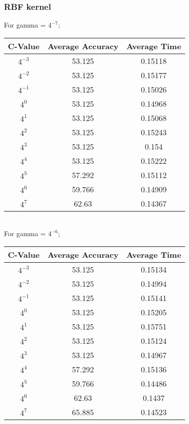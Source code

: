 \documentclass[letter,11pt]{article}
\begin{document}
\subsubsection{RBF kernel}
			
For gamma = $4^{-7}$;

\begin{tabular}{|c| c |c |} 
	\hline
	C-Value & Average Accuracy & Average Time \\ [0.5ex] 			
	\hline
	$4^{-3}$ & 53.125  & 0.15118 \\ [0.5ex] 
	\hline
	$4^{-2}$ & 53.125 & 0.15177  \\ 
	\hline
	$4^{-1}$ &  53.125 	  & 0.15026\\
	\hline
	$4^{0}$ &  53.125  & 0.14968\\
	\hline
	$4^{1}$ & 53.125  & 0.15068\\
	\hline
	$4^{2}$ &  53.125 & 0.15243\\
	\hline
	$4^{3}$ &   53.125  & 0.154\\
	\hline
	$4^{4}$ &  53.125  & 0.15222\\
	\hline
	$4^{5}$ &  57.292   & 0.15112\\
	\hline
	$4^{6}$ & 59.766  & 0.14909\\
	\hline
	$4^{7}$ &  62.63 & 0.14367\\
	\hline
	
\end{tabular}\\

For gamma = $4^{-6}$;

\begin{tabular}{|c| c |c |} 
	\hline
	C-Value & Average Accuracy & Average Time \\ [0.5ex] 			
	\hline
	$4^{-3}$ & 53.125  & 0.15134 \\ [0.5ex] 
	\hline
	$4^{-2}$ & 53.125 & 0.14994  \\ 
	\hline
	$4^{-1}$ &  53.125 	  & 0.15141\\
	\hline
	$4^{0}$ &  53.125  & 0.15205\\
	\hline
	$4^{1}$ & 53.125  & 0.15751\\
	\hline
	$4^{2}$ &  53.125 & 0.15124\\
	\hline
	$4^{3}$ &   53.125  & 0.14967\\
	\hline
	$4^{4}$ &  57.292  & 0.15136\\
	\hline
	$4^{5}$ &  59.766   & 0.14486\\
	\hline
	$4^{6}$ & 62.63  & 0.1437\\
	\hline
	$4^{7}$ &  65.885 & 0.14523\\
	\hline	
\end{tabular}\\
\end{document}
